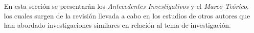 En esta sección se presentarán los \textit{Antecedentes Investigativos} y el \textit{Marco Teórico}, los cuales surgen de la revisión llevada a cabo en los estudios de otros autores que han abordado investigaciones similares en relación al tema de investigación.